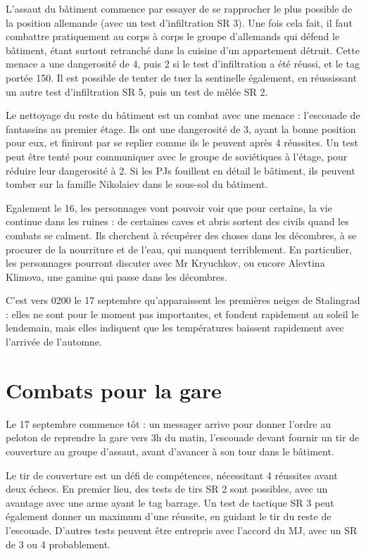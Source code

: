 \documentclass{report}
\begin{document}
\begin{multicols}{2}
L'assaut du bâtiment commence par essayer de se rapprocher le plus possible de la position allemande (avec un test d'infiltration SR 3). Une fois cela fait, il faut combattre pratiquement au corps à corps le groupe d'allemands qui défend le bâtiment, étant surtout retranché dans la cuisine d'un appartement détruit. Cette menace a une dangerosité de 4, puis 2 si le test d'infiltration a été réussi, et le tag portée 150. Il est possible de tenter de tuer la sentinelle également, en réussissant un autre test d'infiltration SR 5, puis un test de mêlée SR 2. 

Le nettoyage du reste du bâtiment est un combat avec une menace : l'escouade de fantassins au premier étage. Ils ont une dangerosité de 3, ayant la bonne position pour eux, et finiront par se replier comme ils le peuvent après 4 réussites. Un test peut être tenté pour communiquer avec le groupe de soviétiques à l'étage, pour réduire leur dangerosité à 2. Si les PJs fouillent en détail le bâtiment, ils peuvent tomber sur la famille Nikolaiev dans le sous-sol du bâtiment.

Egalement le 16, les personnages vont pouvoir voir que pour certains, la vie continue dans les ruines : de certaines caves et abris sortent des civils quand les combats se calment. Ils cherchent à récupérer des choses dans les décombres, à se procurer de la nourriture et de l'eau, qui manquent terriblement. En particulier, les personnages pourront discuter avec Mr Kryuchkov, ou encore Alevtina Klimova, une gamine qui passe dans les décombres.

C'est vers 0200 le 17 septembre qu'apparaissent les premières neiges de Stalingrad : elles ne sont pour le moment pas importantes, et fondent rapidement au soleil le lendemain, mais elles indiquent que les températures baissent rapidement avec l'arrivée de l'automne.

\section{Combats pour la gare}
Le 17 septembre commence tôt : un messager arrive pour donner l'ordre au peloton de reprendre la gare vers 3h du matin, l'escouade devant fournir un tir de couverture au groupe d'assaut, avant d'avancer à son tour dans le bâtiment.

Le tir de couverture est un défi de compétences, nécessitant 4 réussites avant deux échecs. En premier lieu, des tests de tirs SR 2 sont possibles, avec un avantage avec une arme ayant le tag barrage. Un test de tactique SR 3 peut également donner un maximum d'une réussite, en guidant le tir du reste de l'escouade. D'autres tests peuvent être entrepris avec l'accord du MJ, avec un SR de 3 ou 4 probablement.


\end{multicols}
\end{document}
